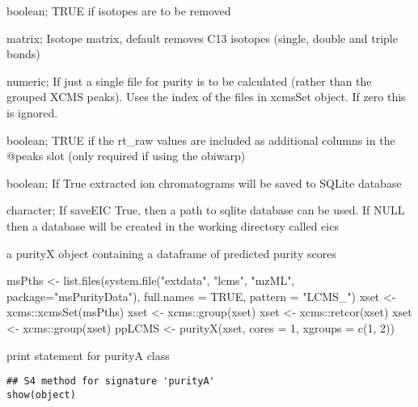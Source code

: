 \documentclass[letterpaper]{book}
\begin{document}
\begin{Arguments}
\begin{ldescription}
\item[\code{isotopes}] boolean; TRUE if isotopes are to be removed

\item[\code{im}] matrix; Isotope matrix, default removes C13 isotopes (single, double and triple bonds)

\item[\code{singleFile}] numeric; If just a single file for purity is to be calculated (rather than the grouped XCMS peaks). Uses the index of the files in xcmsSet object. If zero this is ignored.

\item[\code{rtrawColumns}] boolean; TRUE if the rt\_raw values are included as additional columns in the @peaks slot (only required if using the obiwarp)

\item[\code{saveEIC}] boolean; If True extracted ion chromatograms will be saved to SQLite database

\item[\code{sqlitePth}] character; If saveEIC True, then a path to sqlite database can be used. If NULL then a database will be created in the working directory called eics
\end{ldescription}
\end{Arguments}
%
\begin{Value}
a purityX object containing a dataframe of predicted purity scores
\end{Value}
%
\begin{Examples}
\begin{ExampleCode}
msPths <- list.files(system.file("extdata", "lcms", "mzML", package="msPurityData"), full.names = TRUE, pattern = "LCMS_")
xset <- xcms::xcmsSet(msPths)
xset <- xcms::group(xset)
xset <- xcms::retcor(xset)
xset <- xcms::group(xset)
ppLCMS <- purityX(xset, cores = 1, xgroups = c(1, 2))

\end{ExampleCode}
\end{Examples}
%
\begin{Description}\relax
print statement for purityA class
\end{Description}
%
\begin{Usage}
\begin{verbatim}
## S4 method for signature 'purityA'
show(object)
\end{verbatim}
\end{Usage}
\end{document}
